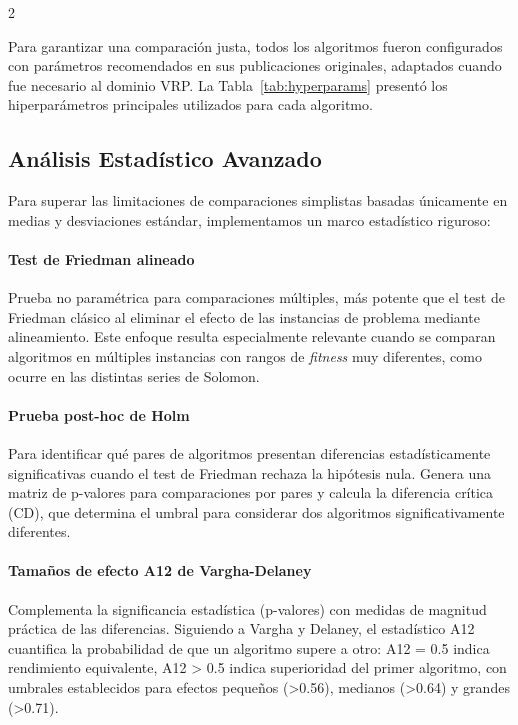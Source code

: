 \documentclass[10pt,a4paper]{extarticle}
\begin{document}
\begin{multicols}{2}

Para garantizar una comparación justa, todos los algoritmos fueron configurados con parámetros recomendados en sus publicaciones originales, adaptados cuando fue necesario al dominio VRP. La Tabla~\ref{tab:hyperparams} presentó los hiperparámetros principales utilizados para cada algoritmo.

\subsection{Análisis Estadístico Avanzado}
Para superar las limitaciones de comparaciones simplistas basadas únicamente en medias y desviaciones estándar, implementamos un marco estadístico riguroso:

\paragraph{Test de Friedman alineado} Prueba no paramétrica para comparaciones múltiples, más potente que el test de Friedman clásico al eliminar el efecto de las instancias de problema mediante alineamiento. Este enfoque resulta especialmente relevante cuando se comparan algoritmos en múltiples instancias con rangos de \textit{fitness} muy diferentes, como ocurre en las distintas series de Solomon.

\paragraph{Prueba post-hoc de Holm} Para identificar qué pares de algoritmos presentan diferencias estadísticamente significativas cuando el test de Friedman rechaza la hipótesis nula. Genera una matriz de p-valores para comparaciones por pares y calcula la diferencia crítica (CD), que determina el umbral para considerar dos algoritmos significativamente diferentes.

\paragraph{Tamaños de efecto A12 de Vargha-Delaney} Complementa la significancia estadística (p-valores) con medidas de magnitud práctica de las diferencias. Siguiendo a Vargha y Delaney, el estadístico A12 cuantifica la probabilidad de que un algoritmo supere a otro: A12 = 0.5 indica rendimiento equivalente, A12 > 0.5 indica superioridad del primer algoritmo, con umbrales establecidos para efectos pequeños (>0.56), medianos (>0.64) y grandes (>0.71).


\end{multicols}
\end{document}
